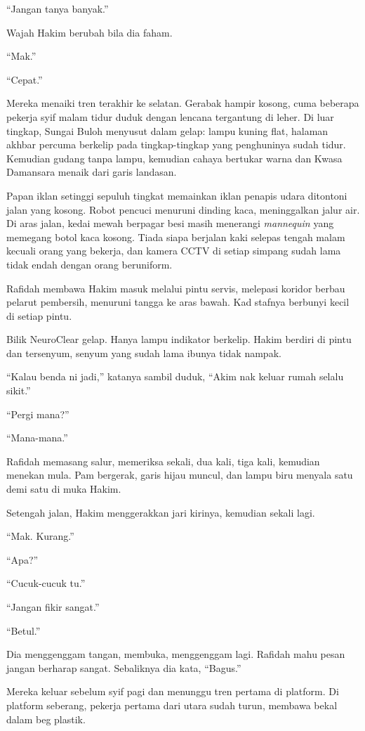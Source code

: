 \documentclass[
  11pt,
  a5paper,
  openany,
  oneside]{book}
\begin{document}
``Jangan tanya banyak.''

Wajah Hakim berubah bila dia faham.

``Mak.''

``Cepat.''

Mereka menaiki tren terakhir ke selatan. Gerabak hampir kosong, cuma
beberapa pekerja syif malam tidur duduk dengan lencana tergantung di
leher. Di luar tingkap, Sungai Buloh menyusut dalam gelap: lampu kuning
flat, halaman akhbar percuma berkelip pada tingkap-tingkap yang
penghuninya sudah tidur. Kemudian gudang tanpa lampu, kemudian cahaya
bertukar warna dan Kwasa Damansara menaik dari garis landasan.

Papan iklan setinggi sepuluh tingkat memainkan iklan penapis udara
ditontoni jalan yang kosong. Robot pencuci menuruni dinding kaca,
meninggalkan jalur air. Di aras jalan, kedai mewah berpagar besi masih
menerangi \emph{mannequin} yang memegang botol kaca kosong. Tiada siapa
berjalan kaki selepas tengah malam kecuali orang yang bekerja, dan
kamera CCTV di setiap simpang sudah lama tidak endah dengan orang
beruniform.

Rafidah membawa Hakim masuk melalui pintu servis, melepasi koridor
berbau pelarut pembersih, menuruni tangga ke aras bawah. Kad stafnya
berbunyi kecil di setiap pintu.

Bilik NeuroClear gelap. Hanya lampu indikator berkelip. Hakim berdiri di
pintu dan tersenyum, senyum yang sudah lama ibunya tidak nampak.

``Kalau benda ni jadi,'' katanya sambil duduk, ``Akim nak keluar rumah
selalu sikit.''

``Pergi mana?''

``Mana-mana.''

Rafidah memasang salur, memeriksa sekali, dua kali, tiga kali, kemudian
menekan mula. Pam bergerak, garis hijau muncul, dan lampu biru menyala
satu demi satu di muka Hakim.

Setengah jalan, Hakim menggerakkan jari kirinya, kemudian sekali lagi.

``Mak. Kurang.''

``Apa?''

``Cucuk-cucuk tu.''

``Jangan fikir sangat.''

``Betul.''

Dia menggenggam tangan, membuka, menggenggam lagi. Rafidah mahu pesan
jangan berharap sangat. Sebaliknya dia kata, ``Bagus.''

Mereka keluar sebelum syif pagi dan menunggu tren pertama di platform.
Di platform seberang, pekerja pertama dari utara sudah turun, membawa
bekal dalam beg plastik.
\end{document}

